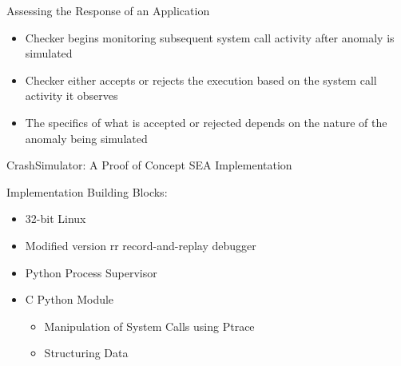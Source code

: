 \documentclass[pdf]{beamer}
\begin{document}
%
%


\begin{frame}{Assessing the Response of an Application}
  \begin{itemize}
    \item{Checker begins monitoring subsequent system call activity
      after anomaly is simulated}
    \item{Checker either accepts or rejects the execution based on the system
      call activity it observes}
    \item{The specifics of what is accepted or rejected depends on the nature
      of the anomaly being simulated}
  \end{itemize}
\end{frame}


\begin{frame}{CrashSimulator: A Proof of Concept SEA Implementation}

  Implementation Building Blocks:

  \begin{itemize}
    \item{32-bit Linux}
    \item{Modified version rr record-and-replay debugger}
    \item{Python Process Supervisor}
    \item{C Python Module}
      \begin{itemize}
        \item{Manipulation of System Calls using Ptrace}
        \item{Structuring Data}
      \end{itemize}
  \end{itemize}
\end{frame}
\end{document}

